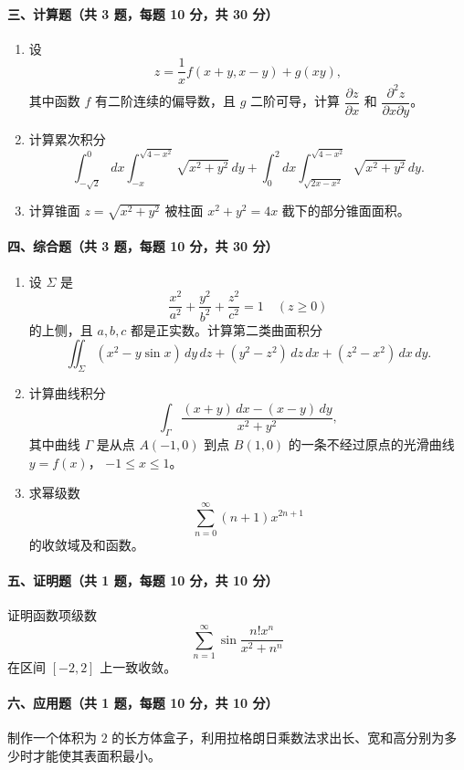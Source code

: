 \paragraph*{三、计算题（共 3 题，每题 10 分，共 30 分）}
\begin{enumerate}
  \item 设
  \[
    z=\frac{1}{x}f(x+y,x-y)+g(xy),
  \]
  其中函数 $f$ 有二阶连续的偏导数，且 $g$ 二阶可导，计算 $\dfrac{\partial z}{\partial x}$ 和
  $\dfrac{\partial^2z}{\partial x\partial y}$。

  \item 计算累次积分
  \[
    \int_{-\sqrt2}^{0}dx\int_{-x}^{\sqrt{4-x^2}}\sqrt{x^2+y^2}\,dy
    +\int_{0}^{2}dx\int_{\sqrt{2x-x^2}}^{\sqrt{4-x^2}}\sqrt{x^2+y^2}\,dy.
  \]

  \item 计算锥面 $z=\sqrt{x^2+y^2}$ 被柱面 $x^2+y^2=4x$ 截下的部分锥面面积。
\end{enumerate}

\paragraph*{四、综合题（共 3 题，每题 10 分，共 30 分）}
\begin{enumerate}
  \item 设 $\Sigma$ 是
  \[
    \frac{x^2}{a^2}+\frac{y^2}{b^2}+\frac{z^2}{c^2}=1\quad (z\ge0)
  \]
  的上侧，且 $a,b,c$ 都是正实数。计算第二类曲面积分
  \[
    \iint_\Sigma (x^2-y\sin x)\,dy\,dz+(y^2-z^2)\,dz\,dx+(z^2-x^2)\,dx\,dy.
  \]

  \item 计算曲线积分
  \[
    \int_\Gamma
    \frac{(x+y)\,dx-(x-y)\,dy}{x^2+y^2},
  \]
  其中曲线 $\Gamma$ 是从点 $A(-1,0)$ 到点 $B(1,0)$ 的一条不经过原点的光滑曲线 $y=f(x)$，
  $-1\le x\le1$。

  \item 求幂级数
  \[
    \sum_{n=0}^{\infty}(n+1)x^{2n+1}
  \]
  的收敛域及和函数。
\end{enumerate}

\paragraph*{五、证明题（共 1 题，每题 10 分，共 10 分）}
证明函数项级数
\[
  \sum_{n=1}^{\infty}\sin\frac{n!x^n}{x^2+n^n}
\]
在区间 $[-2,2]$ 上一致收敛。

\paragraph*{六、应用题（共 1 题，每题 10 分，共 10 分）}
制作一个体积为 $2$ 的长方体盒子，利用拉格朗日乘数法求出长、宽和高分别为多少时才能使其表面积最小。

